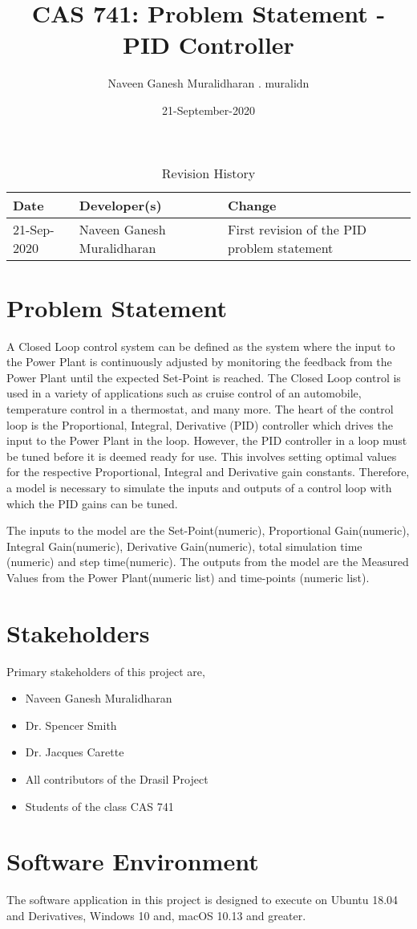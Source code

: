 \documentclass{article}
\title{CAS 741: Problem Statement - \\PID Controller}
\author{Naveen Ganesh Muralidharan . muralidn}
\date{21-September-2020}
\begin{document}
\maketitle

\begin{table}[hp]
\caption{Revision History} \label{TblRevisionHistory}
\begin{tabularx}{\textwidth}{llX}
\toprule
\textbf{Date} & \textbf{Developer(s)} & \textbf{Change}\\
\midrule
21-Sep-2020 & Naveen Ganesh Muralidharan & First revision of the PID problem statement\\
\bottomrule
\end{tabularx}
\end{table}

\section*{Problem Statement}

A Closed Loop control system can be defined as the system where the input to the Power Plant is continuously 
adjusted by monitoring the feedback from the Power Plant until the expected Set-Point is reached. The 
Closed Loop control is used in a variety of applications such as cruise control of an automobile, temperature 
control in a thermostat, and many more. The heart of the control loop is the Proportional, Integral, Derivative 
(PID) controller which drives the input to the Power Plant in the loop. However, the PID controller in a loop must 
be tuned before it is deemed ready for use. This involves setting optimal values for the respective Proportional, 
Integral and Derivative gain constants. Therefore, a model is necessary to simulate the inputs and outputs of a 
control loop with which the PID gains can be tuned.

The inputs to the model are the Set-Point(numeric),  Proportional Gain(numeric), Integral Gain(numeric), Derivative
Gain(numeric), total simulation time (numeric) and step time(numeric). The outputs from the model are the Measured Values
from the Power Plant(numeric list) and time-points (numeric list).

\section*{Stakeholders}
Primary stakeholders of this project are,
\begin{itemize}
\item Naveen Ganesh Muralidharan
\item Dr. Spencer Smith
\item Dr. Jacques Carette
\item All contributors of the Drasil Project
\item Students of the class CAS 741
\end{itemize}

\section*{Software Environment}
The software application in this project is designed to execute on Ubuntu 18.04 and Derivatives, Windows 10 and, macOS 10.13 and greater.
\end{document}
